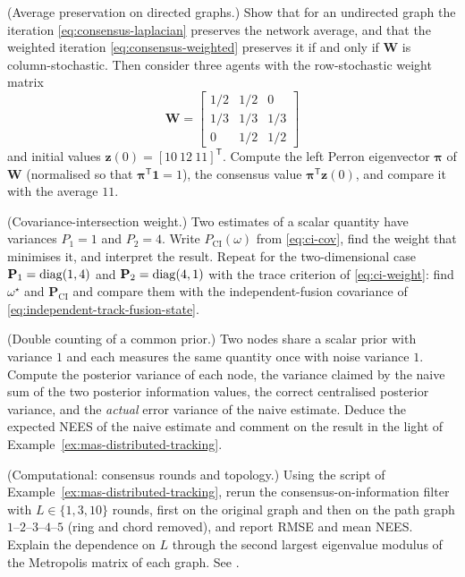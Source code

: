 \begin{prob}\label{prob:ch06:2}
(Average preservation on directed graphs.) Show that for an undirected graph the iteration \eqref{eq:consensus-laplacian} preserves the network average, and that the weighted iteration \eqref{eq:consensus-weighted} preserves it if and only if $\mathbf{W}$ is column-stochastic. Then consider three agents with the row-stochastic weight matrix
\begin{equation*}
\mathbf{W}=\begin{bmatrix}1/2&1/2&0\\ 1/3&1/3&1/3\\ 0&1/2&1/2\end{bmatrix}
\end{equation*}
and initial values $\mathbf{z}(0)=[10\ 12\ 11]^{\mathsf T}$. Compute the left Perron eigenvector $\boldsymbol{\pi}$ of $\mathbf{W}$ (normalised so that $\boldsymbol{\pi}^{\mathsf T}\mathbf{1}=1$), the consensus value $\boldsymbol{\pi}^{\mathsf T}\mathbf{z}(0)$, and compare it with the average $11$.
\end{prob}

\begin{prob}\label{prob:ch06:3}
(Covariance-intersection weight.) Two estimates of a scalar quantity have variances $P_1=1$ and $P_2=4$. Write $P_{\mathrm{CI}}(\omega)$ from \eqref{eq:ci-cov}, find the weight that minimises it, and interpret the result. Repeat for the two-dimensional case $\mathbf{P}_1=\operatorname{diag}(1,4)$ and $\mathbf{P}_2=\operatorname{diag}(4,1)$ with the trace criterion of \eqref{eq:ci-weight}: find $\omega^{\star}$ and $\mathbf{P}_{\mathrm{CI}}$ and compare them with the independent-fusion covariance of \eqref{eq:independent-track-fusion-state}.
\end{prob}

\begin{prob}\label{prob:ch06:4}
(Double counting of a common prior.) Two nodes share a scalar prior with variance $1$ and each measures the same quantity once with noise variance $1$. Compute the posterior variance of each node, the variance claimed by the naive sum of the two posterior information values, the correct centralised posterior variance, and the \emph{actual} error variance of the naive estimate. Deduce the expected NEES of the naive estimate and comment on the result in the light of Example~\ref{ex:mas-distributed-tracking}.
\end{prob}

\begin{prob}\label{prob:ch06:5}
(Computational: consensus rounds and topology.) Using the script of Example~\ref{ex:mas-distributed-tracking}, rerun the consensus-on-information filter with $L\in\{1,3,10\}$ rounds, first on the original graph and then on the path graph $1$--$2$--$3$--$4$--$5$ (ring and chord removed), and report RMSE and mean NEES. Explain the dependence on $L$ through the second largest eigenvalue modulus of the Metropolis matrix of each graph. See .
\end{prob}

